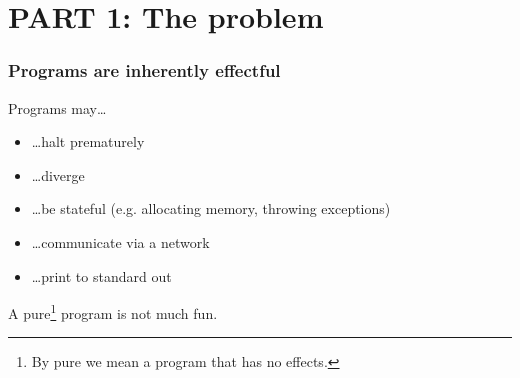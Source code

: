 
\section{PART 1: The problem}

\begin{frame}
  \frametitle{Programs are inherently effectful}
  Programs may\dots
  \begin{itemize}
    \item \dots halt prematurely
    \item \dots diverge
    \item \dots be stateful (e.g. allocating memory, throwing exceptions)
    \item \dots communicate via a network
    \item \dots print to standard out
  \end{itemize}
  A pure\footnote{By pure we mean a program that has no effects.} program is not much fun.
\end{frame}

